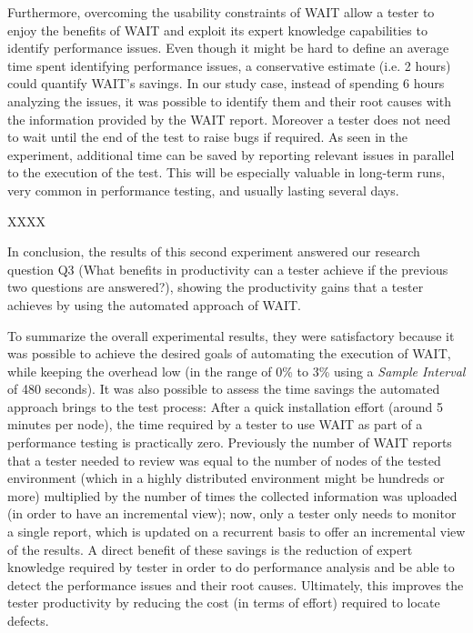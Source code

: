 \documentclass[runningheads,a4paper]{llncs}
\begin{document}
Furthermore, overcoming the usability constraints of WAIT allow a tester
to enjoy the benefits of WAIT and exploit its expert knowledge
capabilities
to identify performance issues.  Even though it might be hard to define an
average time spent identifying performance issues, a conservative estimate (i.e.
2 hours) could quantify WAIT's savings. In our study case, instead of spending 6
hours analyzing the issues, it was possible to identify them and their root
causes with the information provided by the WAIT report. Moreover a tester does
not need to wait until the end of the test to raise bugs if required. As seen in
the experiment, additional time can be saved by reporting relevant issues in
parallel to the execution of the test. This will be especially valuable in
long-term runs, very common in performance testing, and usually lasting several
days.

XXXX

In conclusion, the results of this second experiment answered our research
question Q3 (What benefits in productivity can a tester achieve if the previous
two questions are answered?), showing the productivity gains that a tester
achieves by using the automated approach of WAIT.

To summarize the overall experimental results, they were satisfactory because it
was possible to achieve the desired goals of automating the execution of WAIT,
while keeping the overhead low (in the range of 0\% to 3\% using a \emph{Sample
Interval} of 480 seconds). It was also possible to assess the time
savings the automated approach brings to the test process: After a quick
installation effort (around 5 minutes per node), the time required by a tester
to use WAIT as part of a performance testing is practically zero. Previously the
number of WAIT reports that a tester needed to review was equal to the number of
nodes of the tested environment (which in a highly distributed environment
might be hundreds or more) multiplied by the number of times the collected
information was uploaded (in order to have an incremental view); now, only
a tester only needs to monitor a single report, which is updated on a recurrent
basis to offer an incremental view of the results. A direct benefit of these
savings is the reduction of expert knowledge required by tester in order to do
performance analysis and be able to detect the performance issues and their
root causes. Ultimately, this improves the tester productivity by reducing the
cost (in terms of effort) required to locate defects.
\end{document}
